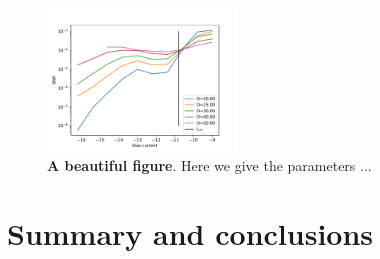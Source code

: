 \documentclass[twocolumn,showpacs,aps,superscriptaddress]{revtex4-1}
\begin{document}
\begin{figure}[h]
	\centering
	\includegraphics[width=0.45\textwidth]{FIGURES/snrinzelcrit.pdf}
	\caption{{\bf A beautiful figure}. Here we give the parameters ...
	}
	\label{snrrinzel}
\end{figure}
\section{Summary and conclusions}



\end{document}
